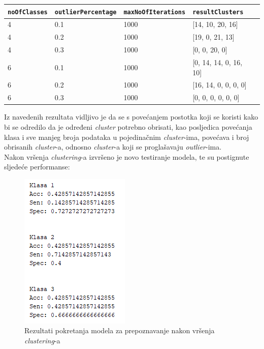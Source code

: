 \documentclass[12pt,a4paper]{article}
\begin{document}
\begin{table}[H]
\centering
\begin{tabular}{|l|l|l|l|l|}
\hline
\textbf{\texttt{noOfClasses}} 		& \textbf{\texttt{outlierPercentage}}   	& \textbf{ \texttt{maxNoOfIterations}} 		& \textbf{\texttt{resultClusters}} 			\\ \hline
4            						& 0.1 								& 1000              							& [14, 10, 20, 16]            				   	\\ \hline
4            						& 0.2 								& 1000              							& [19, 0, 21, 13]      				   		\\ \hline
4            						& 0.3 								& 1000              							& [0, 0, 20, 0]          				   		\\ \hline
6           						& 0.1 								& 1000             							& [0, 14, 14, 0, 16, 10]				 	\\ \hline
6           						& 0.2 								& 1000             							& [16, 14, 0, 0, 0, 0] 					 	\\ \hline
6           						& 0.3 								& 1000             							& [0, 0, 0, 0, 0, 0]    					 	\\ \hline
\end{tabular}
\end{table}

Iz navedenih rezultata vidljivo je da se s povećanjem postotka koji se koristi kako bi se odredilo da je određeni \textit{cluster} potrebno obrisati, kao posljedica povećanja klasa i sve manjeg broja podataka u pojedinačnim \textit{cluster}-ima, povećava i broj obrisanih \textit{cluster}-a, odnosno \textit{cluster}-a koji se proglašavaju \textit{outlier}-ima.\\
Nakon vršenja \textit{clustering}-a izvršeno je novo testiranje modela, te su postignute sljedeće performanse:

\begin{figure}[H]

\center
\includegraphics[scale=0.9]{slikaClustering.png}
\caption{Rezultati pokretanja modela za prepoznavanje nakon vršenja \textit{clustering}-a}
	
\end{figure}
\end{document}
